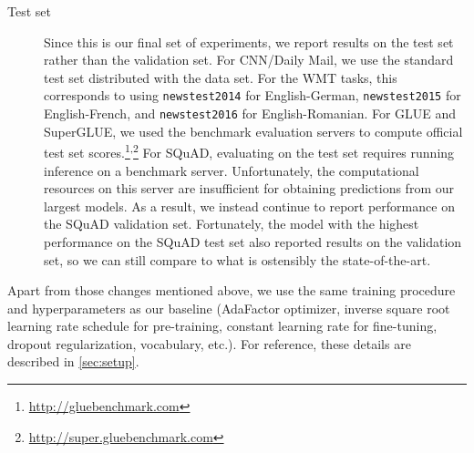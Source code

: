 \documentclass[twoside,11pt]{article}
\begin{document}
\begin{description}
\item[Test set] Since this is our final set of experiments, we report results on the test set rather than the validation set.
For CNN/Daily Mail, we use the standard test set distributed with the data set.
For the WMT tasks, this corresponds to using \texttt{newstest2014} for English-German, \texttt{newstest2015} for English-French, and \texttt{newstest2016} for English-Romanian.
For GLUE and SuperGLUE, we used the benchmark evaluation servers to compute official test set scores.\footnote{\url{http://gluebenchmark.com}}\textsuperscript{,}\footnote{\url{http://super.gluebenchmark.com}}
For SQuAD, evaluating on the test set requires running inference on a benchmark server.
Unfortunately, the computational resources on this server are insufficient for obtaining predictions from our largest models.
As a result, we instead continue to report performance on the SQuAD validation set.
Fortunately, the model with the highest performance on the SQuAD test set also reported results on the validation set, so we can still compare to what is ostensibly the state-of-the-art.

\end{description}

Apart from those changes mentioned above, we use the same training procedure and hyperparameters as our baseline (AdaFactor optimizer, inverse square root learning rate schedule for pre-training, constant learning rate for fine-tuning, dropout regularization, vocabulary, etc.).
For reference, these details are described in \cref{sec:setup}.
\end{document}
